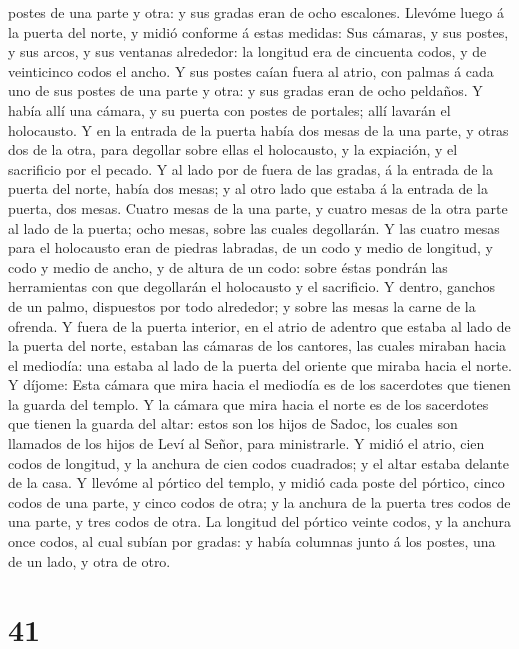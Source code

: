 postes de una parte y otra: y sus gradas eran de ocho escalones.
 Llevóme luego á la puerta del norte, y midió conforme á
estas medidas:  Sus cámaras, y sus postes, y sus arcos, y
sus ventanas alrededor: la longitud era de cincuenta codos, y de
veinticinco codos el ancho.  Y sus postes caían fuera al
atrio, con palmas á cada uno de sus postes de una parte y otra: y sus
gradas eran de ocho peldaños.  Y había allí una cámara, y
su puerta con postes de portales; allí lavarán el holocausto.
 Y en la entrada de la puerta había dos mesas de la una
parte, y otras dos de la otra, para degollar sobre ellas el holocausto,
y la expiación, y el sacrificio por el pecado.  Y al lado
por de fuera de las gradas, á la entrada de la puerta del norte, había
dos mesas; y al otro lado que estaba á la entrada de la puerta, dos
mesas.  Cuatro mesas de la una parte, y cuatro mesas de la
otra parte al lado de la puerta; ocho mesas, sobre las cuales
degollarán.  Y las cuatro mesas para el holocausto eran de
piedras labradas, de un codo y medio de longitud, y codo y medio de
ancho, y de altura de un codo: sobre éstas pondrán las herramientas con
que degollarán el holocausto y el sacrificio.  Y dentro,
ganchos de un palmo, dispuestos por todo alrededor; y sobre las mesas la
carne de la ofrenda.  Y fuera de la puerta interior, en el
atrio de adentro que estaba al lado de la puerta del norte, estaban las
cámaras de los cantores, las cuales miraban hacia el mediodía: una
estaba al lado de la puerta del oriente que miraba hacia el norte.
 Y díjome: Esta cámara que mira hacia el mediodía es de los
sacerdotes que tienen la guarda del templo.  Y la cámara
que mira hacia el norte es de los sacerdotes que tienen la guarda del
altar: estos son los hijos de Sadoc, los cuales son llamados de los
hijos de Leví al Señor, para ministrarle.  Y midió el
atrio, cien codos de longitud, y la anchura de cien codos cuadrados; y
el altar estaba delante de la casa.  Y llevóme al pórtico
del templo, y midió cada poste del pórtico, cinco codos de una parte, y
cinco codos de otra; y la anchura de la puerta tres codos de una parte,
y tres codos de otra.  La longitud del pórtico veinte
codos, y la anchura once codos, al cual subían por gradas: y había
columnas junto á los postes, una de un lado, y otra de otro.

\hypertarget{section-40}{%
\section{41}\label{section-40}}

